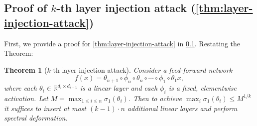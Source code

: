 \documentclass{article}
\theoremstyle{plain}
\newtheorem{theorem}{Theorem}
\theoremstyle{definition}
\theoremstyle{remark}
\begin{document}
\subsection{Proof of $k$-th layer injection attack (\cref{thm:layer-injection-attack})}
\label{app:layer-injection-attack-proof}
First, we provide a proof for \cref{thm:layer-injection-attack} in \cref{app:layer-injection-attack-proof}. Restating the Theorem:

\begin{theorem}[$k$-th layer injection attack]
\label{thm:layer-injection-attack-app}
Consider a feed-forward network \[
f(x) = \theta_{n+1} \circ \phi_{n} \circ \theta_{n} \circ \cdots \circ \phi_1 \circ \theta_1x,
\] where each $\theta_i \in \mathbb{R}^{d_i \times d_{i -1}}$ is a linear layer and each $\phi_i$ is a fixed, elementwise activation. Let $M = \max_{1 \leq i \leq n} \sigma_1(\theta_i)$. Then to achieve $\max_i \sigma_1(\theta_i) \leq M^{1/k}$ it suffices to insert at most $(k - 1) \cdot n$ additional linear layers and perform spectral deformation.
\end{theorem}
\end{document}
